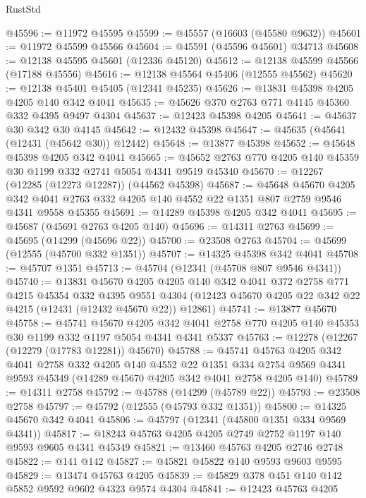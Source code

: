 \begin{lexlean}{RustStd}
\begin{coremodule}
@45596 := @11972 @45595
@45599 := @45557 (@16603 (@45580 @9632))
@45601 := @11972 @45599 @45566
@45604 := @45591 (@45596 @45601) @34713
@45608 := @12138 @45595 @45601 (@12336 @45120)
@45612 := @12138 @45599 @45566 (@17188 @45556)
@45616 := @12138 @45564 @45406 (@12555 @45562)
@45620 := @12138 @45401 @45405 (@12341 @45235)
@45626 := @13831 @45398 @4205 @4205 @140 @342 @4041
@45635 := @45626 @370 @2763 @771 @4145 @45360 @332 @4395 @9497 @4304
@45637 := @12423 @45398 @4205
@45641 := @45637 @30 @342 @30 @4145
@45642 := @12432 @45398
@45647 := @45635 (@45641 (@12431 (@45642 @30)) @12442)
@45648 := @13877 @45398
@45652 := @45648 @45398 @4205 @342 @4041
@45665 := @45652 @2763 @770 @4205 @140 @45359 @30 @1199 @332 @2741 @5054 @4341 @9519 @45340
@45670 := @12267 (@12285 (@12273 @12287)) (@44562 @45398)
@45687 := @45648
    @45670
    @4205
    @342
    @4041
    @2763
    @332
    @4205
    @140
    @4552
    @22
    @1351
    @807
    @2759
    @9546
    @4341
    @9558
    @45355
@45691 := @14289 @45398 @4205 @342 @4041
@45695 := @45687 (@45691 @2763 @4205 @140)
@45696 := @14311 @2763
@45699 := @45695 (@14299 (@45696 @22))
@45700 := @23508 @2763
@45704 := @45699 (@12555 (@45700 @332 @1351))
@45707 := @14325 @45398 @342 @4041
@45708 := @45707 @1351
@45713 := @45704 (@12341 (@45708 @807 @9546 @4341))
@45740 := @13831
    @45670
    @4205
    @4205
    @140
    @342
    @4041
    @372
    @2758
    @771
    @4215
    @45354
    @332
    @4395
    @9551
    @4304
    (@12423 @45670 @4205 @22 @342 @22 @4215 (@12431 (@12432 @45670 @22)) @12861)
@45741 := @13877 @45670
@45758 := @45741
    @45670
    @4205
    @342
    @4041
    @2758
    @770
    @4205
    @140
    @45353
    @30
    @1199
    @332
    @1197
    @5054
    @4341
    @4341
    @5337
@45763 := @12278 (@12267 (@12279 (@17783 @12281)) @45670)
@45788 := @45741
    @45763
    @4205
    @342
    @4041
    @2758
    @332
    @4205
    @140
    @4552
    @22
    @1351
    @334
    @2754
    @9569
    @4341
    @9593
    @45349
    (@14289 @45670 @4205 @342 @4041 @2758 @4205 @140)
@45789 := @14311 @2758
@45792 := @45788 (@14299 (@45789 @22))
@45793 := @23508 @2758
@45797 := @45792 (@12555 (@45793 @332 @1351))
@45800 := @14325 @45670 @342 @4041
@45806 := @45797 (@12341 (@45800 @1351 @334 @9569 @4341))
@45817 := @18243 @45763 @4205 @4205 @2749 @2752 @1197 @140 @9593 @9605 @4341 @45349
@45821 := @13460 @45763 @4205 @2746 @2748
@45822 := @141 @142
@45827 := @45821 @45822 @140 @9593 @9603 @9595
@45829 := @13474 @45763 @4205
@45839 := @45829 @378 @451 @140 @142 @5852 @9592 @9602 @4323 @9574 @4304
@45841 := @12423 @45763 @4205

\end{coremodule}
\end{lexlean}
